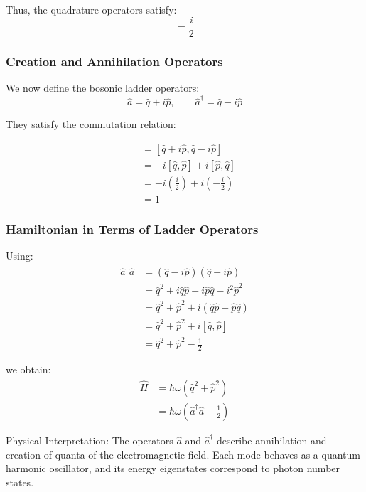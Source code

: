 Thus, the quadrature operators satisfy:
\begin{equation}
[\hat{q}, \hat{p}] = \frac{i}{2}
\label{com}
\end{equation}

\subsubsection{Creation and Annihilation Operators}

We now define the bosonic ladder operators:
\begin{equation*}
\hat{a} = \hat{q} + i\hat{p}, \qquad
\hat{a}^\dagger = \hat{q} - i\hat{p}
\end{equation*}

They satisfy the commutation relation:

\begin{align*}
[\hat{a}, \hat{a}^\dagger]
&= [\hat{q} + i\hat{p}, \hat{q} - i\hat{p}] \\
&= -i[\hat{q}, \hat{p}] + i[\hat{p}, \hat{q}] \\
&= -i\left(\frac{i}{2}\right) + i\left(-\frac{i}{2}\right) \\
&= 1
\end{align*}

\subsubsection{Hamiltonian in Terms of Ladder Operators}

Using:
\begin{align*}
\hat{a}^\dagger \hat{a}
&= (\hat{q} - i\hat{p})(\hat{q} + i\hat{p}) \\
&= \hat{q}^2 + i\hat{q}\hat{p} - i\hat{p}\hat{q} - i^2 \hat{p}^2 \\
&= \hat{q}^2 + \hat{p}^2 + i(\hat{q}\hat{p} - \hat{p}\hat{q}) \\
&= \hat{q}^2 + \hat{p}^2 + i[\hat{q}, \hat{p}] \\
&= \hat{q}^2 + \hat{p}^2 - \frac{1}{2}
\end{align*}

we obtain:
\begin{align*}
\hat{H}
&= \hbar\omega (\hat{q}^2 + \hat{p}^2) \\
&= \hbar\omega \left( \hat{a}^\dagger \hat{a} + \frac{1}{2} \right)
\end{align*}

Physical Interpretation: The operators $\hat{a}$ and $\hat{a}^\dagger$ describe annihilation and creation of quanta of the electromagnetic field. Each mode behaves as a quantum harmonic oscillator, and its energy eigenstates correspond to photon number states.


